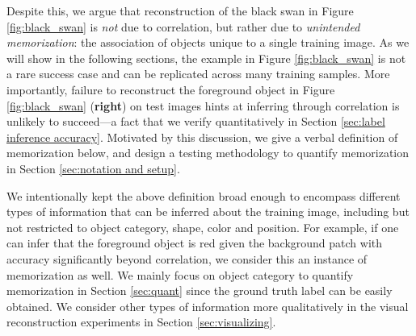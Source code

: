 Despite this, we argue that reconstruction of the black swan in Figure \ref{fig:black_swan} is \emph{not} due to correlation, but rather due to \emph{unintended memorization}: the association of objects unique to a single training image. As we will show in the following sections, the example in Figure \ref{fig:black_swan} is not a rare success case and can be replicated across many training samples. More importantly, failure to reconstruct the foreground object in Figure \ref{fig:black_swan} (\textbf{right}) on test images hints at inferring through correlation is unlikely to succeed---a fact that we verify quantitatively in Section \ref{sec:label inference accuracy}. Motivated by this discussion, we give a verbal definition of \dejavu memorization below, and design a testing methodology to quantify \dejavu memorization in Section \ref{sec:notation and setup}.



 We intentionally kept the above definition broad enough to encompass different types of information that can be inferred about the training image, including but not restricted to object category, shape, color and position. For example, if one can infer that the foreground object is red given the background patch with accuracy significantly beyond correlation, we consider this an instance of \dejavu memorization as well. We mainly focus on object category to quantify \dejavu memorization in Section \ref{sec:quant} since the ground truth label can be easily obtained. We consider other types of information more qualitatively in the visual reconstruction experiments in Section \ref{sec:visualizing}.

